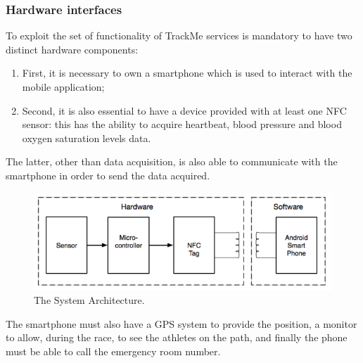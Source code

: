 \subsubsection{Hardware interfaces}
To exploit the set of functionality of TrackMe services is mandatory to have two distinct hardware components:
\begin{enumerate}
\item First, it is necessary to own a smartphone which is used to interact with the mobile application;
\item Second, it is also essential to have a device provided with at least one NFC sensor: this has the ability to acquire heartbeat, blood pressure and blood oxygen saturation levels data.
\end{enumerate}
The latter, other than data acquisition, is also able to communicate with the smartphone in order to send the data acquired.\\
\begin{figure}[h!]
  \includegraphics[width=\linewidth]{Images/hardware}
  \caption{The System Architecture.}
  \label{fig:The System Architecture}
\end{figure} 
The smartphone must also have a GPS system to provide the position, a monitor to allow, during the race, to see the athletes on the path, and finally the phone must be able to call the emergency room number.

